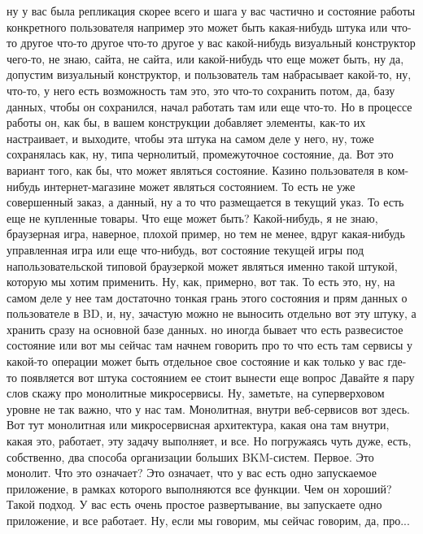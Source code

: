 \documentclass[12pt]{article} %
\begin{document}
ну у вас была репликация скорее всего и шага у вас частично и состояние работы конкретного пользователя например это может быть какая-нибудь штука или что-то другое что-то другое что-то другое у вас какой-нибудь визуальный конструктор чего-то, не знаю, сайта, не сайта, или какой-нибудь что еще может быть, ну да, допустим визуальный конструктор, и пользователь там набрасывает какой-то, ну, что-то, у него есть возможность там это, это что-то сохранить потом, да, базу данных, чтобы он сохранился, начал работать там или еще что-то. Но в процессе работы он, как бы, в вашем конструкции добавляет элементы, как-то их настраивает, и выходите, чтобы эта штука на самом деле у него, ну, тоже сохранялась как, ну, типа чернолитый, промежуточное состояние, да. Вот это вариант того, как бы, что может являться состояние. Казино пользователя в ком-нибудь интернет-магазине может являться  состоянием. То есть не уже совершенный заказ, а данный, ну а то что размещается в текущий указ. То есть еще не купленные товары. Что еще может быть? Какой-нибудь, я не знаю, браузерная игра, наверное, плохой пример, но тем не менее, вдруг какая-нибудь управленная игра или еще что-нибудь, вот состояние текущей игры под напользовательской типовой браузеркой может являться именно такой штукой, которую мы хотим применить. Ну, как, примерно, вот так.  То есть это, ну, на самом деле у нее там достаточно тонкая грань этого состояния и прям данных о пользователе в BD, и, ну, зачастую можно не выносить отдельно вот эту штуку, а хранить сразу на основной базе данных.  но иногда бывает что есть развесистое состояние или вот мы сейчас там начнем говорить про то что есть там сервисы у какой-то операции может быть отдельное свое состояние и как только у вас где-то появляется вот штука состоянием ее стоит вынести еще вопрос Давайте я пару слов скажу про монолитные микросервисы.  Ну, заметьте, на суперверховом уровне не так важно, что у нас там.  Монолитная, внутри веб-сервисов вот здесь.  Вот тут монолитная или микросервисная архитектура, какая она там внутри, какая это, работает, эту задачу выполняет, и все.  Но погружаясь чуть дуже, есть, собственно, два способа организации больших BKM-систем.  Первое.  Это монолит. Что это означает?  Это означает, что у вас есть одно запускаемое приложение, в рамках которого выполняются все функции.  Чем он хороший?  Такой подход.  У вас есть очень простое развертывание, вы запускаете одно приложение, и все работает.  Ну, если мы говорим, мы сейчас говорим, да, про...
\end{document}
